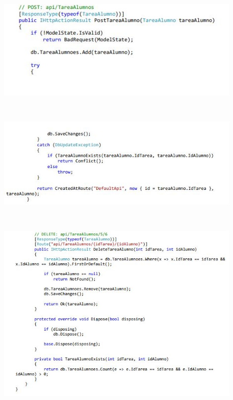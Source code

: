 \begin{flushleft}
\begin{itemize}
\textbf{ }\\

\begin{center}
	\includegraphics[width=12cm]{./Imagenes/paso16-3} 
	\end{center}

\textbf{ }\\

\begin{center}
	\includegraphics[width=12cm]{./Imagenes/paso16-4} 
	\end{center}
\textbf{ }\\

\begin{center}
	\includegraphics[width=12cm]{./Imagenes/paso16-5} 
	\end{center}



\end{itemize}
\end{flushleft}
